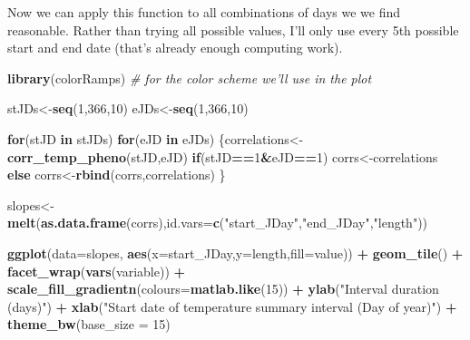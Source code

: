 \documentclass[
]{book}
\newenvironment{Shaded}{\begin{snugshade}}{\end{snugshade}}
\newcommand{\CommentTok}[1]{\textcolor[rgb]{0.56,0.35,0.01}{\textit{#1}}}
\newcommand{\ControlFlowTok}[1]{\textcolor[rgb]{0.13,0.29,0.53}{\textbf{#1}}}
\newcommand{\DataTypeTok}[1]{\textcolor[rgb]{0.13,0.29,0.53}{#1}}
\newcommand{\DecValTok}[1]{\textcolor[rgb]{0.00,0.00,0.81}{#1}}
\newcommand{\KeywordTok}[1]{\textcolor[rgb]{0.13,0.29,0.53}{\textbf{#1}}}
\newcommand{\NormalTok}[1]{#1}
\newcommand{\OperatorTok}[1]{\textcolor[rgb]{0.81,0.36,0.00}{\textbf{#1}}}
\newcommand{\StringTok}[1]{\textcolor[rgb]{0.31,0.60,0.02}{#1}}
\begin{document}
Now we can apply this function to all combinations of days we we find reasonable. Rather than trying all possible values, I'll only use every 5th possible start and end date (that's already enough computing work).

\begin{Shaded}
\begin{Highlighting}[]
\KeywordTok{library}\NormalTok{(colorRamps) }\CommentTok{# for the color scheme we'll use in the plot}

\NormalTok{stJDs<-}\KeywordTok{seq}\NormalTok{(}\DecValTok{1}\NormalTok{,}\DecValTok{366}\NormalTok{,}\DecValTok{10}\NormalTok{)}
\NormalTok{eJDs<-}\KeywordTok{seq}\NormalTok{(}\DecValTok{1}\NormalTok{,}\DecValTok{366}\NormalTok{,}\DecValTok{10}\NormalTok{)}

\ControlFlowTok{for}\NormalTok{(stJD }\ControlFlowTok{in}\NormalTok{ stJDs)}
  \ControlFlowTok{for}\NormalTok{(eJD }\ControlFlowTok{in}\NormalTok{ eJDs)}
\NormalTok{    \{correlations<-}\KeywordTok{corr_temp_pheno}\NormalTok{(stJD,eJD)}
    \ControlFlowTok{if}\NormalTok{(stJD}\OperatorTok{==}\DecValTok{1}\OperatorTok{&}\NormalTok{eJD}\OperatorTok{==}\DecValTok{1}\NormalTok{) corrs<-correlations }\ControlFlowTok{else}
\NormalTok{      corrs<-}\KeywordTok{rbind}\NormalTok{(corrs,correlations)}
\NormalTok{\}}


\NormalTok{slopes<-}\KeywordTok{melt}\NormalTok{(}\KeywordTok{as.data.frame}\NormalTok{(corrs),}\DataTypeTok{id.vars=}\KeywordTok{c}\NormalTok{(}\StringTok{"start_JDay"}\NormalTok{,}\StringTok{"end_JDay"}\NormalTok{,}\StringTok{"length"}\NormalTok{))}

\KeywordTok{ggplot}\NormalTok{(}\DataTypeTok{data=}\NormalTok{slopes, }\KeywordTok{aes}\NormalTok{(}\DataTypeTok{x=}\NormalTok{start_JDay,}\DataTypeTok{y=}\NormalTok{length,}\DataTypeTok{fill=}\NormalTok{value)) }\OperatorTok{+}
\StringTok{  }\KeywordTok{geom_tile}\NormalTok{() }\OperatorTok{+}
\StringTok{  }\KeywordTok{facet_wrap}\NormalTok{(}\KeywordTok{vars}\NormalTok{(variable)) }\OperatorTok{+}
\StringTok{  }\KeywordTok{scale_fill_gradientn}\NormalTok{(}\DataTypeTok{colours=}\KeywordTok{matlab.like}\NormalTok{(}\DecValTok{15}\NormalTok{)) }\OperatorTok{+}
\StringTok{  }\KeywordTok{ylab}\NormalTok{(}\StringTok{"Interval duration (days)"}\NormalTok{) }\OperatorTok{+}\StringTok{ }
\StringTok{  }\KeywordTok{xlab}\NormalTok{(}\StringTok{"Start date of temperature summary interval (Day of year)"}\NormalTok{) }\OperatorTok{+}
\StringTok{  }\KeywordTok{theme_bw}\NormalTok{(}\DataTypeTok{base_size =} \DecValTok{15}\NormalTok{)}
\end{Highlighting}
\end{Shaded}
\end{document}
